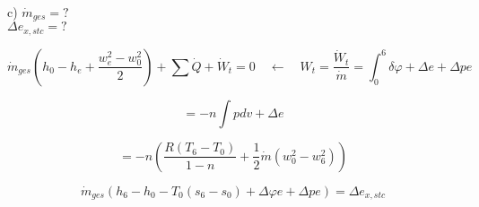 c) $\dot{m}_{ges} = ?$ \\
$\Delta e_{x,stc} = ?$

\[
\dot{m}_{ges} \left( h_0 - h_e + \frac{w_e^2 - w_0^2}{2} \right) + \sum \dot{Q} + \dot{W}_t = 0 \quad \leftarrow \quad W_t = \frac{\dot{W}_t}{\dot{m}} = \int_{0}^{6} \delta \varphi + \Delta e + \Delta pe
\]

\[
= -n \int pdv + \Delta e
\]

\[
= -n \left( \frac{R \left( T_6 - T_0 \right)}{1 - n} + \frac{1}{2} \dot{m} \left( w_0^2 - w_6^2 \right) \right)
\]

\[
\dot{m}_{ges} \left( h_6 - h_0 - T_0 \left( s_6 - s_0 \right) + \Delta \varphi e + \Delta pe \right) = \Delta e_{x,stc}
\]